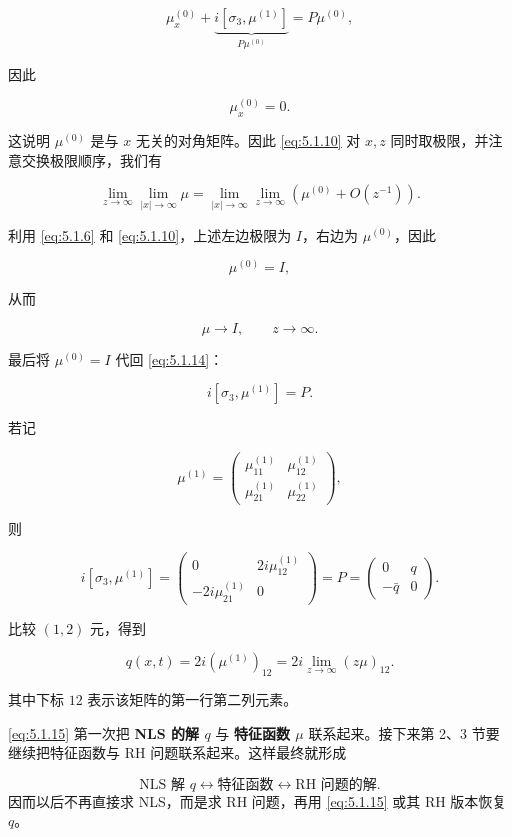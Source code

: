 \documentclass[
    lang=cn,
    scheme=chinese,
    mode=simple,
    device=normal,
    color=blue,
    math=cm,
    thmcnt=section,
    12pt
]{elegantbook}
\begin{document}
\[
    \mu_x^{(0)}
    +\underbrace{i[\sigma_3,\mu^{(1)}]}_{P\mu^{(0)}}
    =P\mu^{(0)},
\]

因此

\[
    \mu_x^{(0)}=0.
\]

这说明 $\mu^{(0)}$ 是与 $x$ 无关的对角矩阵。因此 \eqref{eq:5.1.10} 对 $x,z$ 同时取极限，并注意交换极限顺序，我们有

\[
    \lim\limits_{z\to\infty}\lim\limits_{\lvert x\rvert\to\infty}\mu
    =
    \lim\limits_{\lvert x\rvert\to\infty}\lim\limits_{z\to\infty}
    \left(\mu^{(0)}+O(z^{-1})\right).
\]

利用 \eqref{eq:5.1.6} 和 \eqref{eq:5.1.10}，上述左边极限为 $I$，右边为 $\mu^{(0)}$，因此

\[
    \mu^{(0)}=I,
\]

从而

\[
    \mu\to I,\qquad z\to\infty.
\]

最后将 $\mu^{(0)}=I$ 代回 \eqref{eq:5.1.14}：

\[
    i[\sigma_3,\mu^{(1)}]=P.
\]

若记

\[
    \mu^{(1)}=
    \begin{pmatrix}
        \mu_{11}^{(1)} & \mu_{12}^{(1)} \\
        \mu_{21}^{(1)} & \mu_{22}^{(1)}
    \end{pmatrix},
\]

则

\[
    i[\sigma_3,\mu^{(1)}]
    =
    \begin{pmatrix}
        0 & 2i\mu_{12}^{(1)} \\
        -2i\mu_{21}^{(1)} & 0
    \end{pmatrix}
    =
    P
    =
    \begin{pmatrix}
        0 & q \\
        -\bar q & 0
    \end{pmatrix}.
\]

比较 $(1,2)$ 元，得到

\begin{equation}
    q(x,t)
    =
    2i(\mu^{(1)})_{12}
    =
    2i\lim\limits_{z\to\infty}(z\mu)_{12}.
    \tag{5.1.15}
    \label{eq:5.1.15}
\end{equation}

其中下标 $12$ 表示该矩阵的第一行第二列元素。

\begin{callout}
    \eqref{eq:5.1.15} 第一次把 \textbf{NLS 的解 $q$} 与 \textbf{特征函数 $\mu$} 联系起来。接下来第 2、3 节要继续把特征函数与 RH 问题联系起来。这样最终就形成

    \[
        \text{NLS 解 }q
        \longleftrightarrow
        \text{特征函数}
        \longleftrightarrow
        \text{RH 问题的解}.
    \]
    因而以后不再直接求 NLS，而是求 RH 问题，再用 \eqref{eq:5.1.15} 或其 RH 版本恢复 $q$。
\end{callout}
\end{document}
